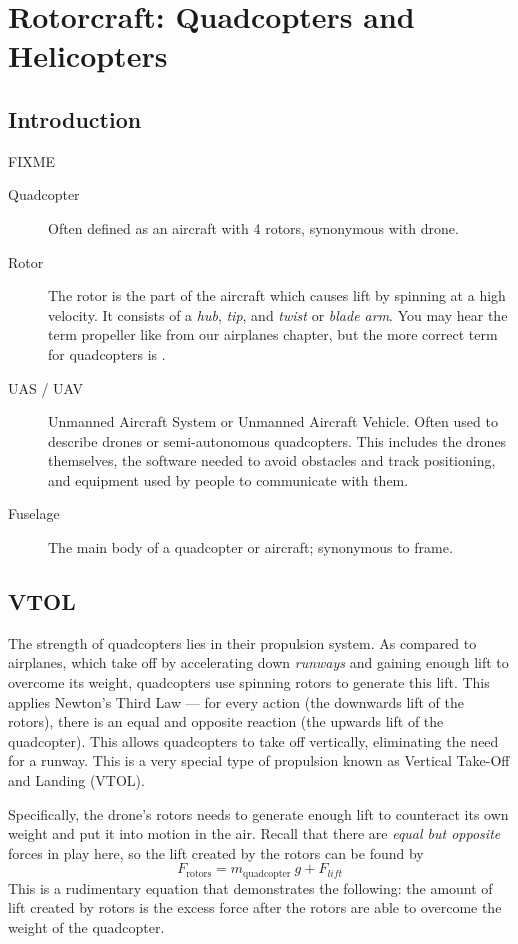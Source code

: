 \chapter{Rotorcraft: Quadcopters and Helicopters}

\section{Introduction}
FIXME

\begin{description}
    \item[Quadcopter] Often defined as an aircraft with 4 rotors, synonymous with drone.
    \item[Rotor] The rotor is the part of the aircraft which causes lift by spinning at a high velocity. It consists of a \emph{hub}, \emph{tip}, and \emph{twist} or \emph{blade arm}. You may hear the term propeller like from our airplanes chapter, but the more correct term for quadcopters is .
    \item[UAS / UAV] Unmanned Aircraft System or Unmanned Aircraft Vehicle. Often used to describe drones or semi-autonomous quadcopters. This includes the drones themselves, the software needed to avoid obstacles and track positioning, and equipment used by people to communicate with them.
    \item[Fuselage] The main body of a quadcopter or aircraft; synonymous to frame.
\end{description}
\section{VTOL}
The strength of quadcopters lies in their propulsion system. As compared to airplanes, which take off by accelerating down \emph{runways} and gaining enough lift to overcome its weight, quadcopters use spinning rotors to generate this lift. This applies Newton's Third Law — for every action (the downwards lift of the rotors), there is an equal and opposite reaction (the upwards lift of the quadcopter). This allows quadcopters to take off vertically, eliminating the need for a runway. This is a very special type of propulsion known as Vertical Take-Off and Landing (VTOL).

Specifically, the drone's rotors needs to generate enough lift to counteract its own weight and put it into motion in the air. Recall that there are \emph{equal but opposite} forces in play here, so the lift created by the rotors can be found by
\begin{equation*}
    F_{\text{rotors}} = m_{\text{quadcopter}} \ g + F_{lift}
\end{equation*}
This is a rudimentary equation that demonstrates the following: the amount of lift created by rotors is the excess force after the rotors are able to overcome the weight of the quadcopter.

